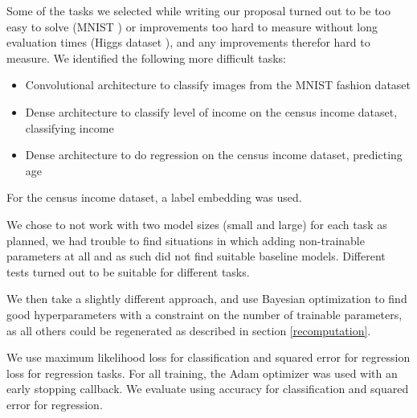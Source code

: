 \documentclass[]{article}
\begin{document}
\begin{multicols}{2}
	Some of the tasks we selected while writing our proposal turned out to be too easy to solve (MNIST \cite{lecun-mnist}) or improvements too hard to measure without long evaluation times (Higgs dataset \cite{Dua:2019}), and any improvements therefor hard to measure. We identified the following more difficult tasks:
	\begin{itemize}
		\itemsep0em
		\item Convolutional architecture to classify images from the MNIST fashion dataset \cite{xiao2017/online}
		\item Dense architecture to classify level of income on the census income dataset, classifying income \cite{Asuncion+Newman:2007}
		\item Dense architecture to do regression on the census income dataset, predicting age \cite{Asuncion+Newman:2007}
	\end{itemize}
	For the census income dataset, a label embedding was used.
	
	We chose to not work with two model sizes (small and large) for each task as planned, we had trouble to find situations in which adding non-trainable parameters at all and as such did not find suitable baseline models. Different tests turned out to be suitable for different tasks.
	
	We then take a slightly different approach, and use Bayesian optimization to find good hyperparameters with a constraint on the number of trainable parameters, as all others could be regenerated as described in section \ref{recomputation}.
	
	We use maximum likelihood loss for classification and squared error for regression loss for regression tasks. For all training, the Adam optimizer was used with an early stopping callback. We evaluate using accuracy for classification and squared error for regression.	


		
	

\end{multicols}
\end{document}
